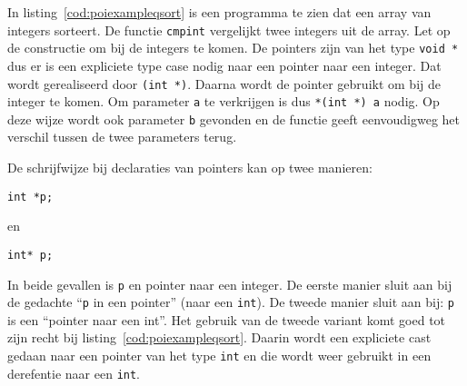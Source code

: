 In listing~\ref{cod:poiexampleqsort} is een programma te zien dat een array van integers sorteert. De functie \texttt{cmpint} vergelijkt twee integers uit de array. Let op de constructie om bij de integers te komen. De pointers zijn van het type \texttt{void~*} dus er is een expliciete type case nodig naar een pointer naar een integer. Dat wordt gerealiseerd door \texttt{(int~*)}. Daarna wordt de pointer gebruikt om bij de integer te komen. Om parameter \texttt{a} te verkrijgen is dus \texttt{*(int~*)~a} nodig. Op deze wijze wordt ook parameter \texttt{b} gevonden en de functie geeft eenvoudigweg het verschil tussen de twee parameters terug.

%
%
%
%
%
%
%
%


\begin{infobox}
De schrijfwijze bij declaraties van pointers kan op twee manieren:

\hspace*{1em}\texttt{int *p;}

en

\hspace*{1em}\texttt{int* p;}

In beide gevallen is \texttt{p} en pointer naar een integer. De eerste manier sluit aan bij de gedachte ``\texttt{p} in een pointer'' (naar een \texttt{int}). De tweede manier sluit aan bij: \texttt{p} is een ``pointer naar een int''. Het gebruik van de tweede variant komt goed tot zijn recht bij listing~\ref{cod:poiexampleqsort}. Daarin wordt een expliciete cast gedaan naar een pointer van het type \texttt{int} en die wordt weer gebruikt in een derefentie naar een \texttt{int}.
\end{infobox}


